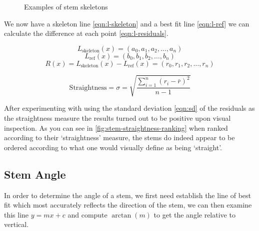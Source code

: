 \begin{figure}[h!]
    \caption{Examples of stem skeletons}
    \label{fig:stem-skeletons}
\end{figure}

We now have a skeleton line \cref{eqn:l-skeleton} and a best fit line \cref{eqn:l-ref} we can calculate the difference at each point \cref{eqn:l-residuals}.

\begin{equation} \label{eqn:l-skeleton}
    L_{\text{skeleton}}(x) = (a_0, a_1, a_2, \ldots, a_n)
\end{equation}
\begin{equation} \label{eqn:l-ref}
    L_{\text{ref}}(x) = (b_0, b_1, b_2, \ldots, b_n)
\end{equation}
\begin{equation} \label{eqn:l-residuals}
    R(x) = L_{\text{skeleton}}(x) - L_{\text{ref}}(x) = (r_0, r_1, r_2, \ldots, r_n)
\end{equation}

\begin{equation} \label{eqn:sd}
\text{Straightness} = \sigma = \sqrt{\frac{\sum\limits_{i=1}^{n}\left(r_{i} - \bar{r}\right)^{2}}{n-1}}
\end{equation}

After experimenting with using the standard deviation \cref{eqn:sd} of the residuals as the straightness measure the results turned out to be positive upon visual inspection. As you can see in \cref{fig:stem-straightness-ranking} when ranked according to their `straightness' measure, the stems do indeed appear to be ordered according to what one would visually define as being `straight'.



\subsection{Stem Angle}

In order to determine the angle of a stem, we first need establish the line of best fit which most accurately reflects the direction of the stem, we can then examine this line $y = mx + c$ and compute $\arctan(m)$ to get the angle relative to vertical.

